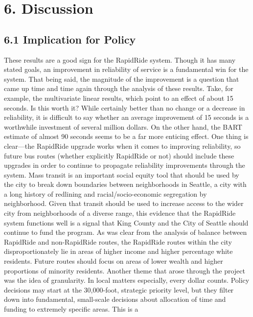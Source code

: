 \documentclass[
  12pt,
]{article}
\begin{document}
\section{6. Discussion}\label{discussion}

\subsection{6.1 Implication for Policy}\label{implication-for-policy}

These results are a good sign for the RapidRide system. Though it has
many stated goals, an improvement in reliability of service is a
fundamental win for the system. That being said, the magnitude of the
improvement is a question that came up time and time again through the
analysis of these results. Take, for example, the multivariate linear
results, which point to an effect of about 15 seconds. Is this worth it?
While certainly better than no change or a decrease in reliability, it
is difficult to say whether an average improvement of 15 seconds is a
worthwhile investment of several million dollars. On the other hand, the
BART estimate of almost 90 seconds seems to be a far more enticing
effect. One thing is clear---the RapidRide upgrade works when it comes
to improving reliability, so future bus routes (whether explicitly
RapidRide or not) should include these upgrades in order to continue to
propagate reliability improvements through the system. Mass transit is
an important social equity tool that should be used by the city to break
down boundaries between neighborhoods in Seattle, a city with a long
history of redlining and racial/socio-economic segregation by
neighborhood. Given that transit should be used to increase access to
the wider city from neighborhoods of a diverse range, this evidence that
the RapidRide system functions well is a signal that King County and the
City of Seattle should continue to fund the program. As was clear from
the analysis of balance between RapidRide and non-RapidRide routes, the
RapidRide routes within the city disproportionately lie in areas of
higher income and higher percentage white residents. Future routes
should focus on areas of lower wealth and higher proportions of minority
residents. Another theme that arose through the project was the idea of
granularity. In local matters especially, every dollar counts. Policy
decisions may start at the 30,000-foot, strategic priority level, but
they filter down into fundamental, small-scale decisions about
allocation of time and funding to extremely specific areas. This is a
\end{document}
